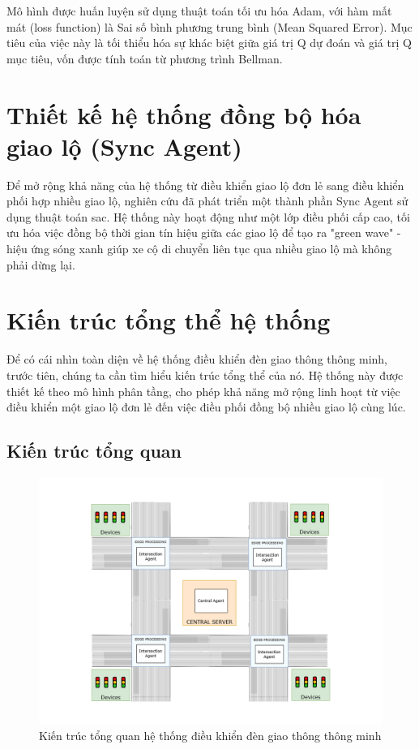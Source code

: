 Mô hình được huấn luyện sử dụng thuật toán tối ưu hóa Adam, với hàm mất mát (loss function) là Sai số bình phương trung bình (Mean Squared Error). Mục tiêu của việc này là tối thiểu hóa sự khác biệt giữa giá trị Q dự đoán và giá trị Q mục tiêu, vốn được tính toán từ phương trình Bellman.

\section{Thiết kế hệ thống đồng bộ hóa giao lộ (Sync Agent)}

Để mở rộng khả năng của hệ thống từ điều khiển giao lộ đơn lẻ sang điều khiển phối hợp nhiều giao lộ, nghiên cứu đã phát triển một thành phần Sync Agent sử dụng thuật toán \ac{sac}. Hệ thống này hoạt động như một lớp điều phối cấp cao, tối ưu hóa việc đồng bộ thời gian tín hiệu giữa các giao lộ để tạo ra "green wave" - hiệu ứng sóng xanh giúp xe cộ di chuyển liên tục qua nhiều giao lộ mà không phải dừng lại.

\section{Kiến trúc tổng thể hệ thống}
Để có cái nhìn toàn diện về hệ thống điều khiển đèn giao thông thông minh, trước tiên, chúng ta cần tìm hiểu kiến trúc tổng thể của nó. Hệ thống này được thiết kế theo mô hình phân tầng, cho phép khả năng mở rộng linh hoạt từ việc điều khiển một giao lộ đơn lẻ đến việc điều phối đồng bộ nhiều giao lộ cùng lúc.
\subsection{Kiến trúc tổng quan}

\begin{figure}[!htp]
    \centering
    \includegraphics[width=\textwidth]{img/overview_architecture.png}
    \caption{Kiến trúc tổng quan hệ thống điều khiển đèn giao thông thông minh}
    \label{fig:overview_architecture}
\end{figure}

